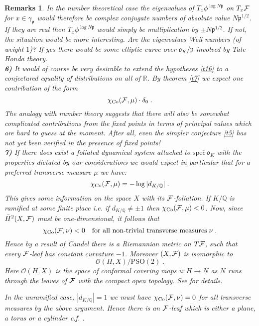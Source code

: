 \documentclass[11pt,leqno]{article}
\newcommand{\Co}{\mathrm{Co}}
\newcommand{\PSO}{\mathrm{PSO}}
\newcommand{\Q}{{\mathbb{Q}}}
\newcommand{\R}{{\mathbb{R}}}
\newcommand{\spec}{\mathrm{spec}\,}
\newcommand{\Fh}{{\cal F}}
\newcommand{\Oh}{\mathcal{O}}
\newcommand{\eo}{\mathfrak{o}}
\newcommand{\ep}{\mathfrak{p}}
\newcommand{\oH}{\bar{H}}
\newtheorem{remarks}[theorem]{Remarks}
\begin{document}
\begin{remarks}
In the number theoretical case the eigenvalues of $T_x \phi^{\log N\ep}$ on $T_x \Fh$ for $x \in \gamma_{\ep}$ would therefore be complex conjugate numbers of absolute value $N\ep^{1/2}$. If they are real then $T_x \phi^{\log N\ep}$ would simply be mutliplication by $\pm N\ep^{1/2}$. If not, the situation would be more interesting. Are the eigenvalues Weil numbers (of weight $1$)? If yes there would be some elliptic curve over $\eo_K / \ep$ involved by Tate--Honda theory. \\
{\bf 6)} It would of course be very desirable to extend the hypotheses \ref{t16} to a conjectured equality of distributions on all of $\R$. By theorem \ref{t7} we expect one contribution of the form
\[
\chi_{\Co} (\Fh , \mu) \cdot \delta_0 \; .
\]
The analogy with number theory suggests that there will also be somewhat complicated contributions from the fixed points in terms of principal values which are hard to guess at the moment. After all, even the simpler conjecture \ref{t5} has not yet been verified in the presence of fixed points!\\
{\bf 7)} If there does exist a foliated dynamical system attached to $\overline{\spec \eo_K}$ with the properties dictated by our considerations we would expect in particular that for a preferred transverse measure $\mu$ we have:
\[
\chi_{\Co} (\Fh , \mu) = - \log |d_{K / \Q}| \; .
\]
This gives some information on the space $X$ with its $\Fh$-foliation. If $K / \Q$ is ramified at some finite place i.e. if $d_{K / \Q} \neq \pm 1$ then $\chi_{\Co} (\Fh , \mu) < 0$. Now, since $\oH^2 (X, \Fh)$ must be one-dimensional, it follows that
\[
\chi_{\Co} (\Fh , \nu) < 0 \quad \mbox{for all non-trivial transverse measures} \; \nu \; .
\]
Hence by a result of Candel \cite{Ca} there is a Riemannian metric on $T \Fh$, such that every $\Fh$-leaf has constant curvature $-1$. Moreover $(X , \Fh)$ is isomorphic to
\[
\Oh (H , X) / \PSO (2) \; .
\]
Here $\Oh (H , X)$ is the space of conformal covering maps $u : H \to N$ as $N$ runs through the leaves of $\Fh$ with the compact open topology. See \cite{Ca} for details.

In the unramified case, $|d_{K / \Q}| = 1$ we must have $\chi_{\Co} (\Fh , \nu) = 0$ for all transverse measures by the above argument. Hence there is an $\Fh$-leaf which is either a plane, a torus or a cylinder c.f. \cite{Ca}.
\end{remarks}
\end{document}
